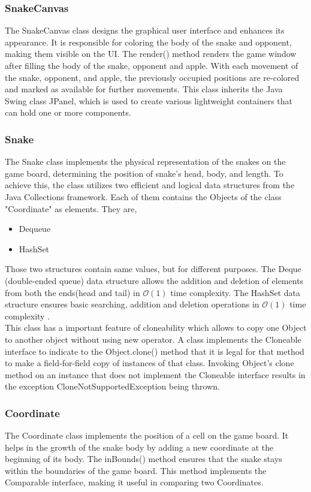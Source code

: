 \documentclass[a4paper,12pt]{article}
\begin{document}
\subsubsection{SnakeCanvas}
The SnakeCanvas class designs the graphical user interface and enhances its appearance. It is responsible for coloring the body of the snake and opponent, making them visible on the UI.
The render() method renders the game window after filling the body of the snake, opponent and apple.
With each movement of the snake, opponent, and apple, the previously occupied positions are re-colored and marked as available for further movements.
This class inherits the Java Swing class JPanel, which is used to create various lightweight containers that can hold one or more components.
\subsubsection{Snake}
The Snake class implements the physical representation of the snakes on the game board, determining the position of snake's head, body, and length.
To achieve this, the class utilizes two efficient and logical data structures from the Java Collections framework. Each of them contains the Objects of the class "Coordinate" as elements. They are,
\begin{itemize}
\item Dequeue
\item HashSet
\end{itemize}
Those two structures contain same values, but for different purposes.
The Deque (double-ended queue) data structure allows the addition and deletion of elements from both the ends(head and tail) in $\mathcal{O}(1)$ time complexity. 
The HashSet data structure ensures basic searching, addition and deletion operations in $\mathcal{O}(1)$ time complexity .\\
This class has a important feature of cloneability which allows to copy one Object to another object without using new operator.
A class implements the Cloneable interface to indicate to the Object.clone() method that it is legal for that method to make a field-for-field copy of instances of that class.
Invoking Object's clone method on an instance that does not implement the Cloneable interface results in the exception CloneNotSupportedException being thrown.\cite{Cloneable}
\subsubsection{Coordinate}
The Coordinate class implements the position of a cell on the game board. It helps in the growth of the snake body by adding a new coordinate at the beginning of its body.
The inBounds() method ensures that the snake stays within the boundaries of the game board. This method implements the Comparable interface, making it useful in comparing two Coordinates. 
\end{document}
